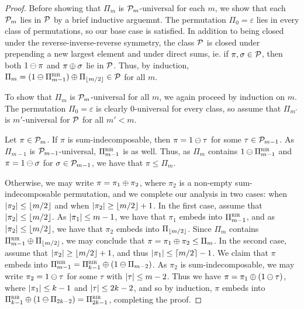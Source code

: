 \begin{proof}
	Before showing that $\Pi_{m}$ is $\P_m$-universal for each $m$, we show that each $\P_m$ lies in $\P$ by a brief inductive arguemnt. The permutation $\Pi_0 = \varepsilon$ lies in every class of permutations, so our base case is satisfied. In addition to being closed under the reverse-inverse-reverse symmetry, the class $\P$ is closed under prepending a new largest element and under direct sums, ie. if $\pi, \sigma \in \P$, then both $1 \skewsum \pi$ and $\pi \directsum \sigma$ lie in $\P$. Thus, by induction, $\Pi_{m} = (1 \skewsum \Pi_{m-1}^{\rir}) \directsum \Pi_{\floor{m/2}} \in \P$ for all $m$.

	To show that $\Pi_{m}$ is $\P_m$-universal for all $m$, we again proceed by induction on $m$. The permutation $\Pi_0 = \varepsilon$ is clearly $0$-universal for every class, so assume that $\Pi_{m'}$ is $m'$-universal for $\P$ for all $m' < m$.

	Let $\pi \in \P_m$. If $\pi$ is sum-indecomposable, then $\pi = 1 \skewsum \tau$ for some $\tau \in \P_{m-1}$. As $\Pi_{m-1}$ is $\P_{m-1}$-universal, $\Pi^{\rir}_{m-1}$ is as well. Thus, as $\Pi_m$ contains $1 \skewsum \Pi^{\rir}_{m-1}$ and $\pi = 1 \skewsum \sigma$ for $\sigma \in \P_{m-1}$, we have that $\pi \le \Pi_m$. 
	
	Otherwise, we may write $\pi = \pi_{1} \directsum \pi_{2}$, where $\pi_{2}$ is a non-empty sum-indecomposable permutation, and we complete our analysis in two cases: when $\size{\pi_{2}} \le \floor{m/2}$ and when $\size{\pi_{2}} \ge \floor{m/2} + 1$. In the first case, assume that $\size{\pi_{2}} \le \floor{m/2}$. As $\size{\pi_{1}} \le m-1$, we have that $\pi_{1}$ embeds into $\Pi_{m-1}^{\rir}$, and as $\size{\pi_{2}} \le \floor{m/2}$, we have that $\pi_{2}$ embeds into $\Pi_{\floor{m/2}}$. Since $\Pi_{m}$ contains $\Pi_{m-1}^{\rir} \directsum \Pi_{\floor{m/2}}$, we may conclude that $\pi = \pi_{1} \directsum \pi_{2} \le \Pi_{m}$. In the second case, assume that $\size{\pi_{2}} \ge \floor{m/2}+1$, and thus $\size{\pi_{1}} \le \ceil{m/2}-1$. We claim that $\pi$ embeds into $\Pi_{m-1}^{\rir} = \Pi_{k-1}^{\rir} \directsum (1 \skewsum \Pi_{m-2})$. As $\pi_{2}$ is sum-indecomposable, we may write $\pi_{2} = 1 \skewsum \tau$ for some $\tau$ with $\size{\tau} \le m-2$. Thus we have $\pi = \pi_{1} \directsum (1 \skewsum \tau)$, where $\size{\pi_{1}} \le k-1$ and $\size{\tau} \le 2k-2$, and so by induction, $\pi$ embeds into $\Pi_{k-1}^{\rir} \directsum (1 \skewsum \Pi_{2k-2}) = \Pi_{2k-1}^{\rir}$, completing the proof.
\end{proof}

